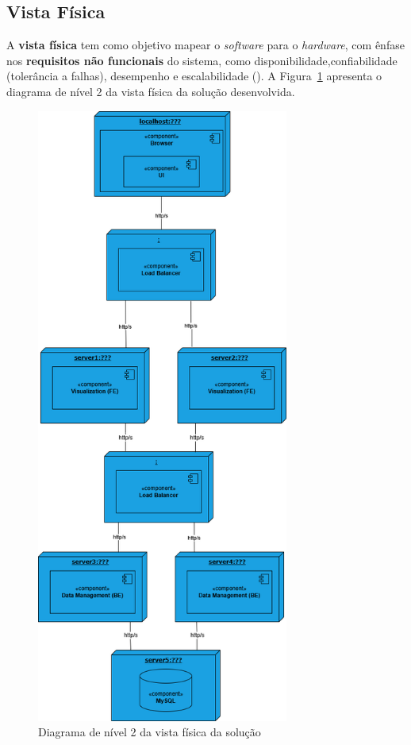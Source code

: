     
\subsection{Vista Física}

A \textbf{vista física} tem como objetivo mapear o \textit{software} para o \textit{hardware}, com ênfase nos \textbf{requisitos não funcionais} do sistema, como disponibilidade,confiabilidade (tolerância a falhas), desempenho e escalabilidade (\cite{Kruchten1995}). A Figura~\ref{fig:physical_view_lv2} apresenta o diagrama de nível 2 da vista física da solução desenvolvida.


\begin{figure}[H]
    \centering
    \includegraphics[height=8in,keepaspectratio]{frontmatter/assets/diagrams/Physical View/physical_view_lv2.drawio.png}
    \caption{Diagrama de nível 2 da vista física da solução}
    \label{fig:physical_view_lv2}
\end{figure}


